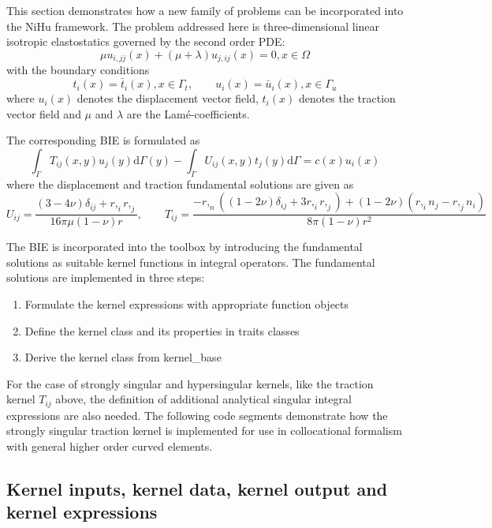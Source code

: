 \documentclass{article}
\newcommand{\td}{\mathrm{d}}
\begin{document}
This section demonstrates how a new family of problems can be incorporated into the NiHu framework.
The problem addressed here is three-dimensional linear isotropic elastostatics governed by the second order PDE:
%
\begin{equation}
\mu u_{i,jj}(x) + \left(\mu + \lambda\right) u_{j,ij}(x) = 0, x \in \Omega
\end{equation}
%
with the boundary conditions
%
\begin{equation}
t_i(x) = \bar{t}_i(x), x \in \Gamma_t,
\qquad u_i(x) = \bar{u}_i(x), x \in \Gamma_u
\end{equation}
%
where $u_i(x)$ denotes the displacement vector field, $t_i(x)$ denotes the traction vector field and $\mu$ and $\lambda$ are the Lamé-coefficients.

The corresponding BIE is formulated as
%
\begin{equation}
\int_{\Gamma} T_{ij}(x,y) u_j(y) \td \Gamma(y) - \int_{\Gamma} U_{ij}(x,y) t_{j}(y) \td \Gamma = c(x) u_i(x)
\end{equation}
%
where the displacement and traction fundamental solutions are given as
%
\begin{equation}
U_{ij} = \frac{(3-4\nu) \delta_{ij} + r,_i r,_j}{16 \pi \mu (1-\nu) r}, \qquad
T_{ij} = \frac{-r,_n ((1-2\nu)\delta_{ij} + 3 r,_i r,_j) + (1-2\nu) (r,_i n_j - r,_j n_i)}{8 \pi (1-\nu) r^2}
\end{equation}

The BIE is incorporated into the toolbox by introducing the fundamental solutions as suitable kernel functions in integral operators.
The fundamental solutions are implemented in three steps:
\begin{enumerate}
	\item Formulate the kernel expressions with appropriate function objects
	\item Define the kernel class and its properties in traits classes
	\item Derive the kernel class from kernel\_base
\end{enumerate}
%
For the case of strongly singular and hypersingular kernels, like the traction kernel $T_{ij}$ above, the definition of additional analytical singular integral expressions are also needed.
The following code segments demonstrate how the strongly singular traction kernel is implemented for use in collocational formalism with general higher order curved elements.

\subsection{Kernel inputs, kernel data, kernel output and kernel expressions}
\end{document}
